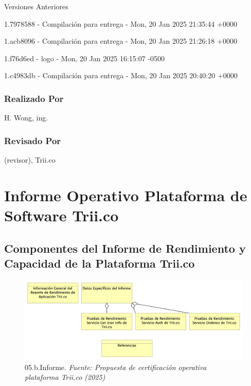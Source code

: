 \documentclass[
  paper=a4,
  ,captions=tableheading
]{scrartcl}
\renewenvironment{quote}{\begin{customblockquote}\list{}{\rightmargin=0em\leftmargin=0em}%
\item\relax\color{blockquote-text}\ignorespaces}{\unskip\unskip\endlist\end{customblockquote}}
\begin{document}
Versiones Anteriores

1.7978588 - Compilación para entrega - Mon, 20 Jan 2025 21:35:44 +0000

1.acb8096 - Compilación para entrega - Mon, 20 Jan 2025 21:26:18 +0000

1.f76d6ed - logo - Mon, 20 Jan 2025 16:15:07 -0500

1.c4983db - Compilación para entrega - Mon, 20 Jan 2025 20:40:20 +0000

\subsubsection{Realizado Por}\label{sec:realizado-por}

H. Wong, ing.

\subsubsection{Revisado Por}\label{sec:revisado-por}

(revisor), Trii.co

\newpage

\section{Informe Operativo Plataforma de Software
Trii.co}\label{sec:informe-operativo-plataforma-de-software-trii.co}

\subsection{Componentes del Informe de Rendimiento y Capacidad de la
Plataforma
Trii.co}\label{sec:componentes-del-informe-de-rendimiento-y-capacidad-de-la-plataforma-trii.co}

\begin{quote}
\end{quote}

\begin{figure}
\centering
\includegraphics{images/05.b.Informe.png}
\caption{05.b.Informe. \emph{Fuente: Propuesta de certificación
operativa plataforma Trii.co
(2025)}}\label{fig:id-04abc8f16f354757a52791da825e4049}
\end{figure}
\end{document}
